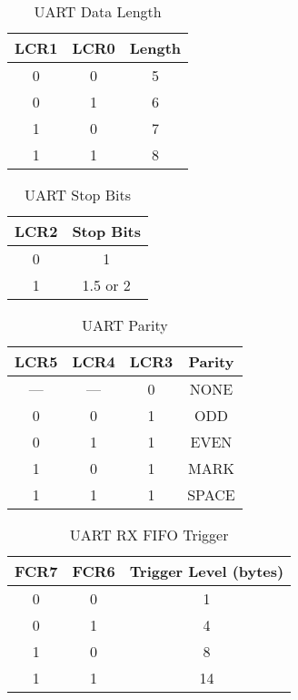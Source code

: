 \begin{table}[h]
    \begin{center}
        \begin{tabular}{|c|c|c|} \hline
            LCR1 & LCR0 & Length \\ \hline\hline
            0 & 0 & 5 \\ \hline
            0 & 1 & 6 \\ \hline
            1 & 0 & 7 \\ \hline
            1 & 1 & 8 \\ \hline
        \end{tabular}
    \end{center}
    \caption{UART Data Length}
    \label{tab:uart_data}
\end{table}

\begin{table}[h]
    \begin{center}
        \begin{tabular}{|c|c|} \hline
            LCR2 & Stop Bits \\ \hline\hline
            0 & 1 \\ \hline
            1 & 1.5 or 2 \\ \hline
        \end{tabular}
    \end{center}
    \caption{UART Stop Bits}
    \label{tab:uart_stop}
\end{table}

\begin{table}[h]
    \begin{center}
        \begin{tabular}{|c|c|c|c|} \hline
            LCR5 & LCR4 & LCR3 & Parity \\ \hline\hline
            --- & --- & 0 & NONE \\ \hline
            0 & 0 & 1 & ODD \\ \hline
            0 & 1 & 1 & EVEN \\ \hline
            1 & 0 & 1 & MARK \\ \hline
            1 & 1 & 1 & SPACE \\ \hline
        \end{tabular}
    \end{center}
    \caption{UART Parity}
    \label{tab:uart_parity}
\end{table}

\begin{table}[h]
    \begin{center}
        \begin{tabular}{|c|c|c|} \hline
            FCR7 & FCR6 & Trigger Level (bytes) \\ \hline\hline
            0 & 0 & 1 \\ \hline
            0 & 1 & 4 \\ \hline
            1 & 0 & 8 \\ \hline
            1 & 1 & 14 \\ \hline
        \end{tabular}
    \end{center}
    \caption{UART RX FIFO Trigger}
    \label{tab:uart_rx_trig}
\end{table}
